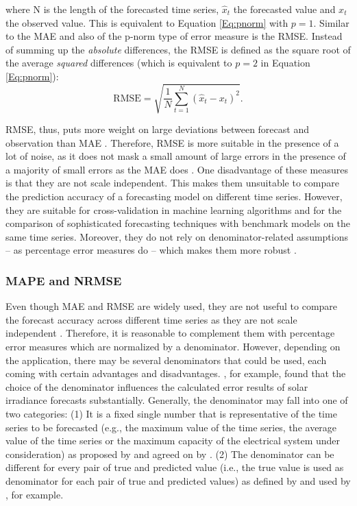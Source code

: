 \noindent where N is the length of the forecasted time series, $\widehat{x}_t$ the forecasted value and $x_t$ the observed value. This is equivalent to Equation \ref{Eq:pnorm} with $p=1$. Similar to the MAE and also of the p-norm type of error measure is the RMSE. Instead of summing up the \textit{absolute} differences, the RMSE is defined as the square root of the average \textit{squared} differences (which is equivalent to $p=2$ in Equation \ref{Eq:pnorm}):
%
\begin{equation} \label{Eq:RMSE}
\text{RMSE}=\sqrt{\frac{1}{N}\sum_{t=1}^N\left(\widehat{x}_t-x_t\right)^2}.
\end{equation}

\noindent RMSE, thus, puts more weight on large deviations between forecast and observation than MAE \citep{Meer:2018}. Therefore, RMSE is more suitable in the presence of a lot of noise, as it does not mask a small amount of large errors in the presence of a majority of small errors as the MAE does \citep{Zhang:2015}. One disadvantage of these measures is that they are not scale independent. This makes them unsuitable to compare the prediction accuracy of a forecasting model on different time series. However, they are suitable for cross-validation in machine learning algorithms and for the comparison of sophisticated forecasting techniques with benchmark models on the same time series. Moreover, they do not rely on denominator-related assumptions -- as percentage error measures do -- which makes them more robust \citep{Hoff:2013}.


\subsubsection{MAPE and NRMSE}

Even though MAE and RMSE are widely used, they are not useful to compare the forecast accuracy across different time series as they are not scale independent \citep{Meer:2018}. Therefore, it is reasonable to complement them with percentage error measures which are normalized by a denominator. However, depending on the application, there may be several denominators that could be used, each coming with certain advantages and disadvantages. \citet{Hoff:2013}, for example, found that the choice of the denominator influences the calculated error results of solar irradiance forecasts substantially. Generally, the denominator may fall into one of two categories: (1) It is a fixed single number that is representative of the time series to be forecasted (e.g., the maximum value of the time series, the average value of the time series or the maximum capacity of the electrical system under consideration) as proposed by \citet{Hoff:2013} and agreed on by \citet{Meer:2018}. (2) The denominator can be different for every pair of true and predicted value (i.e., the true value is used as denominator for each pair of true and predicted values) as defined by \citet{Hyndman:2006} and used by \citet{xie:2018}, for example. 

